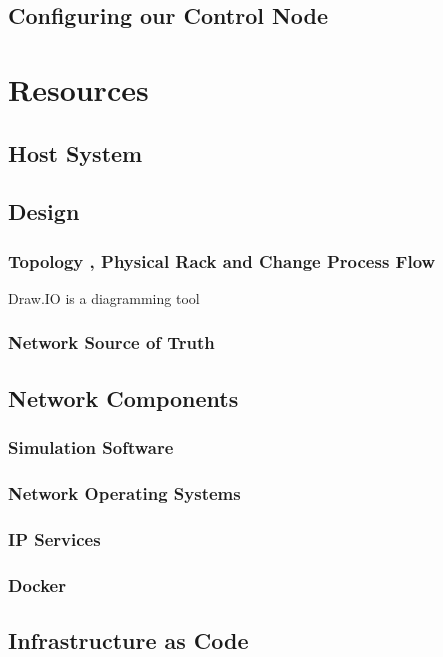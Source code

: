 \documentclass[12pt, letterpaper]{article}
\begin{document}
	\subsection{Configuring our Control Node}
		
		



\newpage

\section{Resources}
	
	\subsection{Host System}
	
	\subsection{Design}
		\subsubsection{Topology , Physical Rack and Change Process Flow}
Draw.IO is a diagramming tool 
		\subsubsection{Network Source of Truth}
	
	\subsection{Network Components}
		\subsubsection{Simulation Software}
		\subsubsection{Network Operating Systems}
		\subsubsection{IP Services}
		\subsubsection{Docker}
		
	\subsection{Infrastructure as Code}
\end{document}
